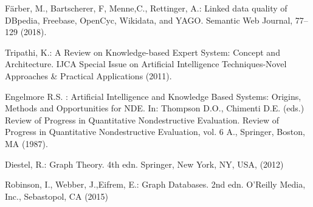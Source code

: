 \documentclass[runningheads]{llncs}
\begin{document}
\begin{thebibliography}{8}
F{\"a}rber, M., Bartscherer, F, Menne,C., Rettinger, A.: Linked data quality of DBpedia, Freebase, OpenCyc, Wikidata, and YAGO. Semantic Web Journal, 77--129 (2018). 

Tripathi, K.: A Review on Knowledge-based Expert System: Concept and Architecture. IJCA Special Issue on Artificial Intelligence Techniques-Novel Approaches \& Practical Applications (2011). 

Engelmore R.S.  : Artificial Intelligence and Knowledge Based Systems: Origins, Methods and Opportunities for NDE. In: Thompson D.O., Chimenti D.E. (eds.) Review of Progress in Quantitative Nondestructive Evaluation. Review of Progress in Quantitative Nondestructive Evaluation, vol. 6 A., 
Springer, Boston, MA (1987). 

Diestel, R.: Graph Theory. 4th edn. Springer, New York, NY, USA, (2012)

Robinson, I., Webber, J.,Eifrem, E.: Graph Databases. 2nd edn. O'Reilly Media, Inc., Sebastopol, CA (2015)

\end{thebibliography}

\end{document}
